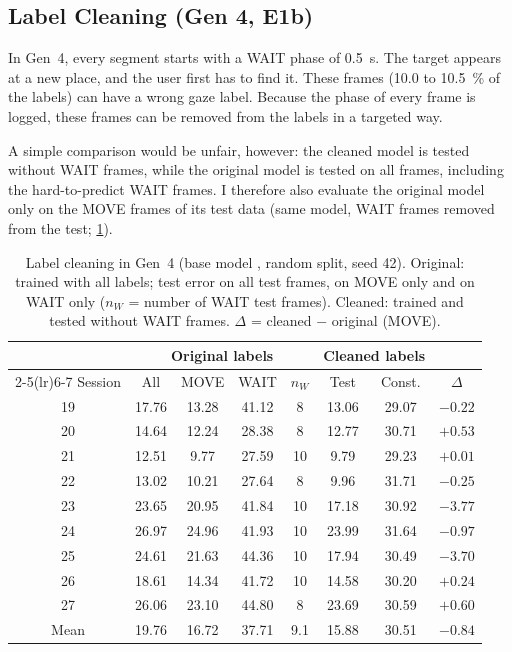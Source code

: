 \subsection{Label Cleaning (Gen 4, E1b)}
\label{sec:cleaning}

In Gen~4, every segment starts with a WAIT phase of \SI{0.5}{\second}. The target
appears at a new place, and the user first has to find it. These frames
(\SI{10.0}{} to \SI{10.5}{\percent} of the labels) can have a wrong gaze label.
Because the phase of every frame is logged, these frames can be removed from
the labels in a targeted way.

A simple comparison would be unfair, however: the cleaned model is tested
without WAIT frames, while the original model is tested on all frames, including
the hard-to-predict WAIT frames. I therefore also evaluate the original model
only on the MOVE frames of its test data (same model, WAIT frames removed from
the test; \cref{tab:cleaning}).

\begin{table}[htbp]
  \centering
  \caption[Label cleaning in Gen~4]{Label cleaning in Gen~4 (base model , random
           split, seed 42). Original: trained with all labels; test error on all
           test frames, on MOVE only and on WAIT only ($n_W$ = number of WAIT
           test frames). Cleaned: trained and tested without WAIT frames.
           $\Delta$ = cleaned $-$ original (MOVE).}
  \label{tab:cleaning}
  \footnotesize
  \setlength{\tabcolsep}{4pt}
  \begin{tabular}{c cccc cc c}
    \toprule
    & \multicolumn{4}{c}{Original labels} & \multicolumn{2}{c}{Cleaned labels} & \\
    \cmidrule(lr){2-5}\cmidrule(lr){6-7}
    Session & All & MOVE & WAIT & $n_W$ & Test & Const. & $\Delta$ \\
    \midrule
    19 & 17.76 & 13.28 & 41.12 & 8  & 13.06 & 29.07 & $-0.22$ \\
    20 & 14.64 & 12.24 & 28.38 & 8  & 12.77 & 30.71 & $+0.53$ \\
    21 & 12.51 &  9.77 & 27.59 & 10 &  9.79 & 29.23 & $+0.01$ \\
    22 & 13.02 & 10.21 & 27.64 & 8  &  9.96 & 31.71 & $-0.25$ \\
    23 & 23.65 & 20.95 & 41.84 & 10 & 17.18 & 30.92 & $-3.77$ \\
    24 & 26.97 & 24.96 & 41.93 & 10 & 23.99 & 31.64 & $-0.97$ \\
    25 & 24.61 & 21.63 & 44.36 & 10 & 17.94 & 30.49 & $-3.70$ \\
    26 & 18.61 & 14.34 & 41.72 & 10 & 14.58 & 30.20 & $+0.24$ \\
    27 & 26.06 & 23.10 & 44.80 & 8  & 23.69 & 30.59 & $+0.60$ \\
    \midrule
    Mean & 19.76 & 16.72 & 37.71 & 9.1 & 15.88 & 30.51 & $-0.84$ \\
    \bottomrule
  \end{tabular}
\end{table}

